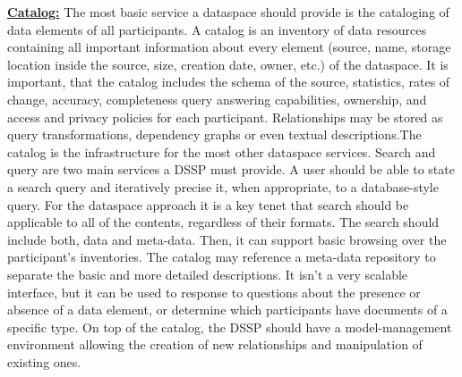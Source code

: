 \uline{\textbf{Catalog:}} 
The most basic service a dataspace should provide is the cataloging of data elements of all participants. A catalog is an inventory of data resources containing all important information about every element (source, name, storage location inside the source, size, creation date, owner, etc.) of the dataspace. It is important, that the catalog includes the schema of the source, statistics, rates of change, accuracy, completeness query answering capabilities, ownership, and access and privacy policies for each participant. Relationships may be stored as query transformations, dependency graphs or even textual descriptions.The catalog is the infrastructure for the most other dataspace services. Search and query are two main services a DSSP must provide. A user should be able to state a search query and iteratively precise it, when appropriate, to a database-style query. For the dataspace approach it is a key tenet that search should be applicable to all of the contents, regardless of their formats.
The search should include both, data and meta-data. Then, it can support basic browsing over the participant's inventories. The catalog may reference a meta-data repository to separate the basic and more detailed descriptions.
It isn't a very scalable interface, but it can be used to response to questions about the presence or absence of a data element, or determine which participants have documents of a specific type. 
On top of the catalog, the DSSP should have a model-management environment allowing the creation of new relationships and manipulation of existing ones.

